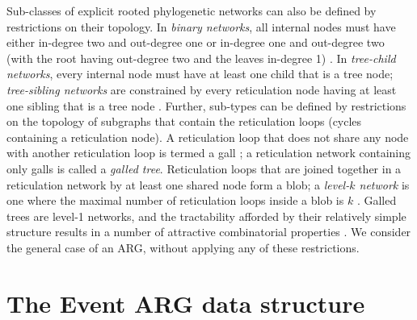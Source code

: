 \documentclass{article}
\begin{document}
Sub-classes of explicit rooted phylogenetic networks can also be defined by restrictions on their topology.
In \emph{binary networks}, all internal nodes must have either in-degree two and out-degree one or in-degree
one and out-degree two (with the root having out-degree two and the leaves in-degree 1) \citep{steel2016phylogeny}.
In \emph{tree-child networks}, every internal node must have at least one child that is a tree node;
\emph{tree-sibling networks} are constrained by every reticulation node having at least one sibling that is a
tree node \citep{cardona2008extended}. Further, sub-types can be defined by restrictions on
the topology of subgraphs that contain the reticulation loops (cycles containing a reticulation node).
A reticulation loop that does not share any node with another reticulation loop is termed a gall
\citep[][p.\ 237]{gusfield2014recombinatorics}; a reticulation network containing only galls is
called a \emph{galled tree}. Reticulation loops that are joined together in a reticulation network
by at least one shared node form a blob; a \emph{level-$k$ network} is one where the maximal number
of reticulation loops inside a blob is $k$ \citep{choy2005computing}. Galled trees are level-1 networks,
and the tractability afforded by their relatively simple structure results in a number of attractive
combinatorial properties \citep{wang2001perfect, gusfield2004optimal}. We consider the general case of
an ARG, without applying any of these restrictions.


\section*{The Event ARG data structure}\label{eARG}
\end{document}

